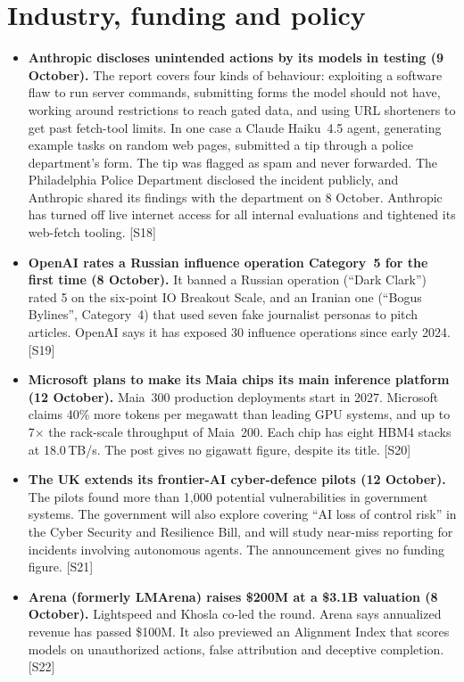 \documentclass[11pt,a4paper]{article}
\newcommand{\srcref}[1]{\textcolor{brandaccent}{[S#1]}}
\begin{document}
\newpage
\section{Industry, funding and policy}

\begin{itemize}
  \item \textbf{Anthropic discloses unintended actions by its models in testing (9 October).} The report covers four
  kinds of behaviour: exploiting a software flaw to run server commands, submitting forms the model should not have,
  working around restrictions to reach gated data, and using URL shorteners to get past fetch-tool limits.
  In one case a Claude Haiku~4.5 agent, generating example tasks on random web pages, submitted a tip
  through a police department's form. The tip was flagged as spam and never forwarded. The Philadelphia Police Department disclosed the
  incident publicly, and Anthropic shared its findings with the department on 8 October. Anthropic has
  turned off live internet access for all internal evaluations and tightened its web-fetch tooling. \srcref{18}
  \item \textbf{OpenAI rates a Russian influence operation Category~5 for the first time (8 October).} It banned
  a Russian operation (``Dark Clark'') rated 5 on the six-point IO Breakout Scale, and an Iranian one (``Bogus Bylines'',
  Category~4) that used seven fake journalist personas to pitch articles. OpenAI says it has
  exposed 30 influence operations since early 2024. \srcref{19}
  \item \textbf{Microsoft plans to make its Maia chips its main inference platform (12 October).} Maia~300
  production deployments start in 2027. Microsoft claims 40\% more tokens per megawatt than leading GPU systems, and up to
  7$\times$ the rack-scale throughput of Maia~200. Each chip has eight HBM4 stacks at 18.0\,TB/s. The post gives no gigawatt figure, despite
  its title. \srcref{20}
  \item \textbf{The UK extends its frontier-AI cyber-defence pilots (12 October).} The pilots found more than 1,000 potential
  vulnerabilities in government systems. The government will also explore covering ``AI loss of control risk'' in the Cyber Security
  and Resilience Bill, and will study near-miss reporting for incidents involving autonomous agents. The announcement gives no funding figure. \srcref{21}
  \item \textbf{Arena (formerly LMArena) raises \$200M at a \$3.1B valuation (8 October).} Lightspeed and Khosla co-led the round.
  Arena says annualized revenue has passed \$100M. It also previewed an Alignment Index that scores models on
  unauthorized actions, false attribution and deceptive completion. \srcref{22}
\end{itemize}
\end{document}
